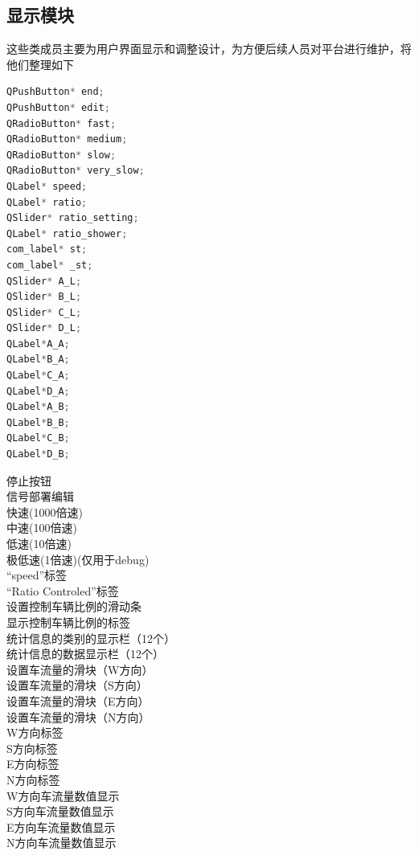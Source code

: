 \documentclass[UTF8,a4paper]{ctexart}
\begin{document}
\subsection{显示模块}
这些类成员主要为用户界面显示和调整设计，为方便后续人员对平台进行维护，将他们整理如下
\begin{multicols}{2}
\begin{lstlisting}[language=C++]
QPushButton* end;
QPushButton* edit;
QRadioButton* fast;
QRadioButton* medium;
QRadioButton* slow;
QRadioButton* very_slow;
QLabel* speed;
QLabel* ratio;
QSlider* ratio_setting;
QLabel* ratio_shower;
com_label* st;
com_label* _st;
QSlider* A_L;
QSlider* B_L;
QSlider* C_L;
QSlider* D_L;
QLabel*A_A;
QLabel*B_A;
QLabel*C_A;
QLabel*D_A;
QLabel*A_B;
QLabel*B_B;
QLabel*C_B;
QLabel*D_B;
\end{lstlisting}
停止按钮 \\
信号部署编辑 \\
快速(1000倍速) \\
中速(100倍速) \\
低速(10倍速) \\
极低速(1倍速)(仅用于debug) \\
“speed”标签\\
“Ratio Controled”标签\\
设置控制车辆比例的滑动条\\
显示控制车辆比例的标签\\
统计信息的类别的显示栏（12个）\\
统计信息的数据显示栏（12个）\\
设置车流量的滑块（W方向）\\
设置车流量的滑块（S方向）\\
设置车流量的滑块（E方向）\\
设置车流量的滑块（N方向）\\
W方向标签\\
S方向标签\\
E方向标签\\
N方向标签\\
W方向车流量数值显示\\
S方向车流量数值显示\\
E方向车流量数值显示\\
N方向车流量数值显示\\
\end{multicols}
\end{document}
